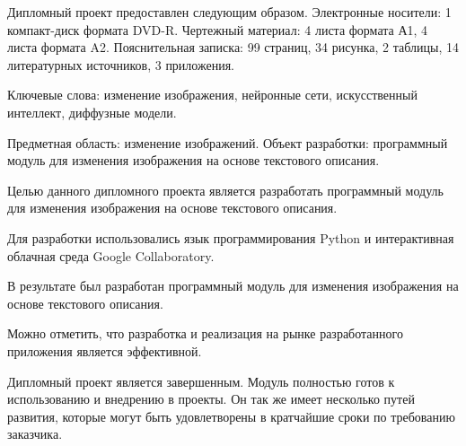 
Дипломный проект предоставлен следующим образом. Электронные носители: 1 компакт-диск формата DVD-R. Чертежный материал: 4 листа формата А1, 4 листа формата A2. Пояснительная записка:
99 страниц, 34 рисунка, 2 таблицы, 14 литературных источников, 3 приложения.

Ключевые слова: изменение изображения, нейронные сети, искусственный интеллект, диффузные модели.

Предметная область: изменение изображений. Объект разработки: программный модуль для изменения изображения на основе текстового описания.

Целью данного дипломного проекта является разработать программный модуль для изменения изображения на основе текстового описания.

Для разработки использовались язык программирования Python и интерактивная облачная среда Google Collaboratory.

В результате был разработан программный модуль для изменения изображения на основе текстового описания. 

Можно отметить, что разработка и реализация на рынке разработанного приложения является эффективной.

Дипломный проект является завершенным. Модуль полностью готов к использованию и внедрению в проекты. Он так же имеет несколько путей развития, которые могут быть удовлетворены в кратчайшие сроки по требованию заказчика.

\newpage
